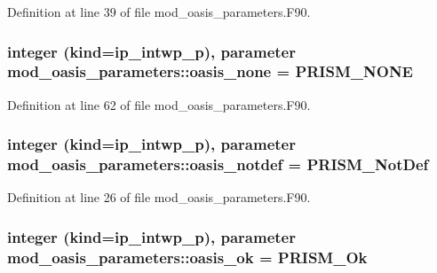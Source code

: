 Definition at line 39 of file mod\+\_\+oasis\+\_\+parameters.\+F90.

\hypertarget{classmod__oasis__parameters_a368402af56fd08ed95ad88d0c987733a}{
\subsubsection[{oasis\+\_\+none}]{\setlength{\rightskip}{0pt plus 5cm}integer (kind=ip\+\_\+intwp\+\_\+p), parameter mod\+\_\+oasis\+\_\+parameters\+::oasis\+\_\+none = P\+R\+I\+S\+M\+\_\+\+N\+O\+N\+E}}\label{classmod__oasis__parameters_a368402af56fd08ed95ad88d0c987733a}


Definition at line 62 of file mod\+\_\+oasis\+\_\+parameters.\+F90.

\hypertarget{classmod__oasis__parameters_acbe396fd3b5e7b00dd66425f0acb546d}{
\subsubsection[{oasis\+\_\+notdef}]{\setlength{\rightskip}{0pt plus 5cm}integer (kind=ip\+\_\+intwp\+\_\+p), parameter mod\+\_\+oasis\+\_\+parameters\+::oasis\+\_\+notdef = P\+R\+I\+S\+M\+\_\+\+Not\+Def}}\label{classmod__oasis__parameters_acbe396fd3b5e7b00dd66425f0acb546d}


Definition at line 26 of file mod\+\_\+oasis\+\_\+parameters.\+F90.

\hypertarget{classmod__oasis__parameters_a3ea125963822918ce37fd3cfd9658c9f}{
\subsubsection[{oasis\+\_\+ok}]{\setlength{\rightskip}{0pt plus 5cm}integer (kind=ip\+\_\+intwp\+\_\+p), parameter mod\+\_\+oasis\+\_\+parameters\+::oasis\+\_\+ok = P\+R\+I\+S\+M\+\_\+\+Ok}}\label{classmod__oasis__parameters_a3ea125963822918ce37fd3cfd9658c9f}


